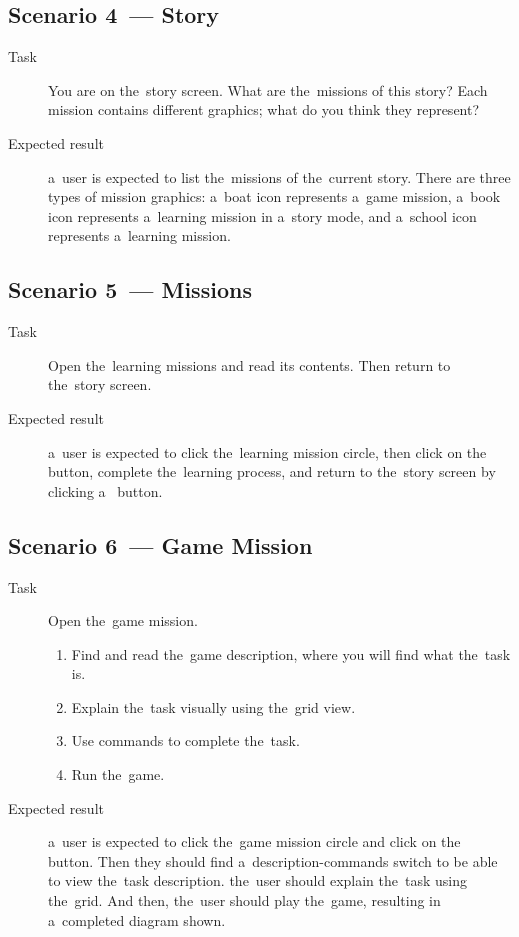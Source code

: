 \subsection*{Scenario 4~--- Story}

\begin{description}
    \item[Task] You are on the~story screen.
    What are the~missions of this story?
    Each mission contains different graphics; what do you think they represent?
    \item[Expected result] a~user is expected to list the~missions of the~current story.
    There are three types of mission graphics: a~boat icon represents a~game mission, a~book icon represents a~learning mission in a~story mode, and a~school icon represents a~learning mission.
\end{description}

\subsection*{Scenario 5~--- Missions}

\begin{description}
    \item[Task] Open the~learning missions and read its contents.
    Then return to the~story screen.
    \item[Expected result] a~user is expected to click the~learning mission circle, then click on the~ button, complete the~learning process, and return to the~story screen by clicking a~ button.
\end{description}

\subsection*{Scenario 6~--- Game Mission}

\begin{description}
    \item[Task] Open the~game mission.
    \begin{enumerate}
        \item Find and read the~game description, where you will find what the~task is.
        \item Explain the~task visually using the~grid view.
        \item Use commands to complete the~task.
        \item Run the~game.
    \end{enumerate}
    \item[Expected result] a~user is expected to click the~game mission circle and click on the~ button.
    Then they should find a~description-commands switch to be able to view the~task description.
    the~user should explain the~task using the~grid.
    And then, the~user should play the~game, resulting in a~completed diagram shown.
\end{description}


